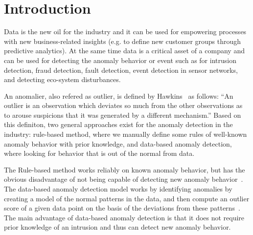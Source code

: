 \section{Introduction}\label{sec-intro}

Data is the new oil for the industry and
it can be used for empowering processes with
new business-related insights
(e.g. to define new customer groups through predictive analytics).
At the same time data is a critical asset of a company and
can be used for detecting the anomaly behavior or event
such as for
intrusion detection,
fraud detection,
fault detection,
event detection in sensor networks,
and detecting eco-system disturbances.

An anomalier,
also refered as outlier, 
is defined by Hawkins~\cite{hawkins1980identification}
as follows:
``An outlier is an observation which
deviates so much from the other observations
as to arouse suspicions that
it was generated by a different mechanism.''
Based on this definiton,
two general approaches exist for the anomaly
detection in the industry:
rule-based method,
where we manually define some rules of
well-known anomaly behavior
with prior knowledge,
and data-based anomaly detection,
where looking for behavior that
is out of the normal from data.

The Rule-based method works reliably on known anomaly behavior,
but has the obvious disadvantage of not being capable of
detecting new anomaly behavior~\cite{}.
The data-based anomaly detection model works by
identifying anomalies by creating a model of
the normal patterns in the data,
and then compute an outlier score of a given data point
on the basis of the deviations from these patterns~\cite{chandola2009anomaly}.
The main advantage of data-based anomaly detection is that
it does not require prior knowledge of an intrusion and
thus can detect new anomaly behavior.

